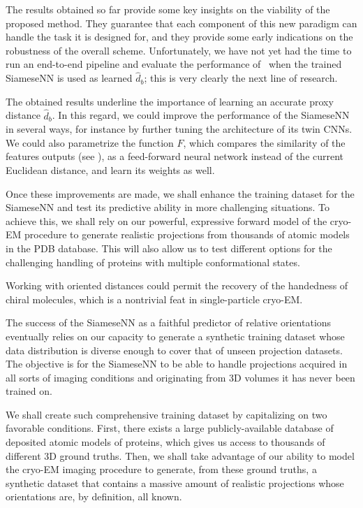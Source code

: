 
The results obtained so far provide some key insights on the viability of the proposed method.
They guarantee that each component of this new paradigm can handle the task it is designed for, and they provide some early indications on the robustness of the overall scheme.
Unfortunately, we have not yet had the time to run an end-to-end pipeline and evaluate the performance of~ when the trained SiameseNN is used as learned $\widehat{d}_b$; this is very clearly the next line of research.

The obtained results underline the importance of learning an accurate proxy distance $\widehat{d}_b$.
In this regard, we could improve the performance of the SiameseNN in several ways, for instance by further tuning the architecture of its twin CNNs.
We could also parametrize the function $F$, which compares the similarity of the features outputs (see ), as a feed-forward neural network instead of the current Euclidean distance, and learn its weights as well.

Once these improvements are made, we shall enhance the training dataset for the SiameseNN and test its predictive ability in more challenging situations.
To achieve this, we shall rely on our powerful, expressive forward model of the cryo-EM procedure to generate realistic projections from thousands of atomic models in the PDB database.
This will also allow us to test different options for the challenging handling of proteins with multiple conformational states.

Working with oriented distances could permit the recovery of the handedness of chiral molecules, which is a nontrivial feat in single-particle cryo-EM.



The success of the SiameseNN as a faithful predictor of relative orientations eventually relies on our capacity to generate a synthetic training dataset whose data distribution is diverse enough to cover that of unseen projection datasets.
The objective is for the SiameseNN to be able to handle projections acquired in all sorts of imaging conditions and originating from 3D volumes it has never been trained on.

We shall create such comprehensive training dataset by capitalizing on two favorable conditions.
First, there exists a large publicly-available database of deposited atomic models of proteins, which gives us access to thousands of different 3D ground truths.
Then, we shall take advantage of our ability to model the cryo-EM imaging procedure to generate, from these ground truths, a synthetic dataset that contains a massive amount of realistic projections whose orientations are, by definition, all known.

